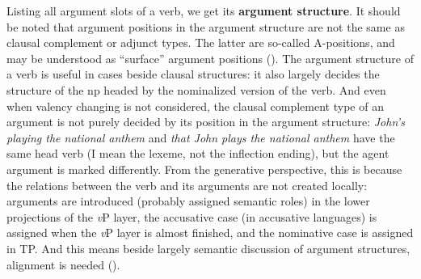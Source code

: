 \documentclass[UTF8, a4paper, oneside, scheme=plain]{ctexart}
\newcommand*{\concept}[1]{\textbf{#1}}
\newcommand*{\corpus}[1]{\emph{#1}}
\newcommand*{\vP}{\textit{v}P}
\begin{document}
Listing all argument slots of a verb,
we get its \concept{argument structure}.
It should be noted that argument positions in the argument structure 
are not the same as clausal complement or adjunct types.
The latter are so-called A-positions,
and may be understood as ``surface'' argument positions ().
The argument structure of a verb 
is useful in cases beside clausal structures:
it also largely decides the structure of the \ac{np} headed by the nominalized version of the verb.
And even when valency changing is not considered, 
the clausal complement type of an argument is not purely decided by its position in the argument structure:
\corpus{John's playing the national anthem} and \corpus{that John plays the national anthem}
have the same head verb (I mean the lexeme, not the inflection ending),
but the agent argument is marked differently.
From the generative perspective,
this is because the relations between the verb and its arguments 
are not created locally:
arguments are introduced (probably assigned semantic roles)
in the lower projections of the \vP{} layer,
the accusative case (in accusative languages) is assigned when the \vP{} layer is almost finished,
and the nominative case is assigned in TP.
And this means beside largely semantic discussion of argument structures,
alignment is needed ().
\end{document}
